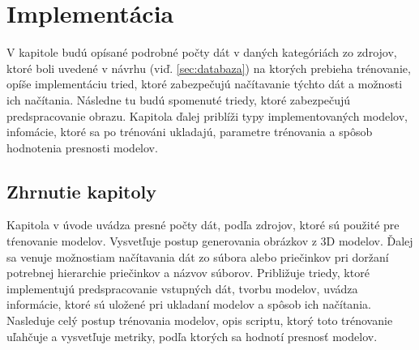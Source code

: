 
\chapter{Implementácia}

V kapitole budú opísané podrobné počty dát v daných kategóriách zo zdrojov, ktoré boli uvedené v návrhu (viď. \ref{sec:databaza})
    na ktorých prebieha trénovanie, opíše implementáciu tried, ktoré zabezpečujú načítavanie týchto dát a možnosti ich načítania.
Následne tu budú spomenuté triedy, ktoré zabezpečujú predspracovanie obrazu.
Kapitola ďalej priblíži typy implementovaných modelov, infomácie, ktoré sa po trénováni ukladajú, parametre trénovania a spôsob hodnotenia presnosti modelov.









\section{Zhrnutie kapitoly}

Kapitola v úvode uvádza presné počty dát, podľa zdrojov, ktoré sú použité pre tŕenovanie modelov.
Vysvetľuje postup generovania obrázkov z 3D modelov.
Ďalej sa venuje možnostiam načítavania dát zo súbora alebo priečinkov pri doržaní potrebnej hierarchie priečinkov a názvov súborov.
Približuje triedy, ktoré implementujú predspracovanie vstupných dát, tvorbu modelov, uvádza informácie, ktoré sú uložené
    pri ukladaní modelov a spôsob ich načítania.
Nasleduje celý postup trénovania modelov, opis scriptu, ktorý toto trénovanie uľahčuje a vysvetľuje metriky, podľa ktorých sa hodnotí presnosť modelov.
